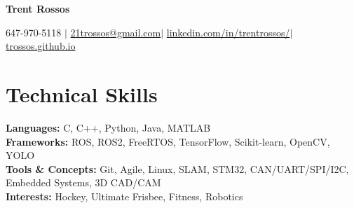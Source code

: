 \documentclass[letterpaper,11pt]{article}
\newcommand\y{-3.8pt}
\begin{document}

\begin{center}
	{\fontsize{36}{40}\selectfont \textbf{Trent \color{colour} Rossos}} \vspace{0pt}
	\color{black}

	\color{black}
	\small 647-970-5118 $|$ \href{mailto:21trossos@gmail.com}{21trossos@gmail.com}$|$
	\href{https://www.linkedin.com/in/trentrossos/}{{linkedin.com/in/trentrossos/}}$|$
	\href{https://trossos.github.io}{{trossos.github.io}} 
\end{center} \vspace{-15pt}


\section{\color{colour} \textbf{Technical Skills} } \vspace{-3pt}
\begin{itemize}[leftmargin=0.15in, label={}]
	\small{\item{
\textbf{Languages:}{ C, C++, Python, Java, MATLAB} \\
\textbf{Frameworks:}{ ROS, ROS2, FreeRTOS, TensorFlow, Scikit-learn, OpenCV, YOLO} \\
\textbf{Tools \& Concepts:}{ Git, Agile, Linux, SLAM, STM32, CAN/UART/SPI/I2C, Embedded Systems, 3D CAD/CAM} \\
		      \textbf{Interests: }{ Hockey, Ultimate Frisbee, Fitness, Robotics}
	      }}\vspace{\y}
\end{itemize}
\end{document}
